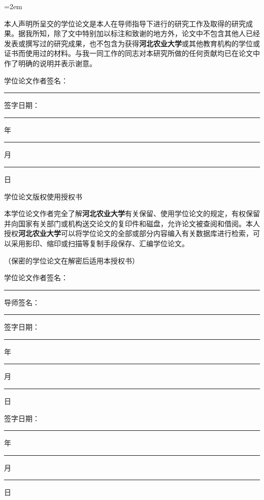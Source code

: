 {\songti\baselineskip=20pt
\parindent=2em%

本人声明所呈交的学位论文是本人在导师指导下进行的研究工作及取得的研究成果。据我所知，除了文中特别加以标注和致谢的地方外，论文中不包含其他人已经发表或撰写过的研究成果，也不包含为获得\textbf{河北农业大学}或其他教育机构的学位或证书而使用过的材料。与我一同工作的同志对本研究所做的任何贡献均已在论文中作了明确的说明并表示谢意。

\vspace{1.5cm}

\noindent
\begin{minipage}{0.48\textwidth}
  学位论文作者签名：\rule[-3pt]{3cm}{0.4pt}
\end{minipage}
\hfill
\begin{minipage}{0.48\textwidth}
  签字日期：\rule[-3pt]{1.2cm}{0.4pt}年\rule[-3pt]{1cm}{0.4pt}月\rule[-3pt]{1cm}{0.4pt}日
\end{minipage}

\vspace{2cm}

\begin{center}
  {\heiti\baselineskip=30pt 学位论文版权使用授权书}\\[12pt]
\end{center}

\vspace{0.3cm}

本学位论文作者完全了解\textbf{河北农业大学}有关保留、使用学位论文的规定，有权保留并向国家有关部门或机构送交论文的复印件和磁盘，允许论文被查阅和借阅。本人授权\textbf{河北农业大学}可以将学位论文的全部或部分内容编入有关数据库进行检索，可以采用影印、缩印或扫描等复制手段保存、汇编学位论文。

\vspace{0.5cm}

\noindent（保密的学位论文在解密后适用本授权书）

\vspace{1.5cm}

\noindent
\begin{minipage}{0.48\textwidth}
  学位论文作者签名：\rule[-3pt]{3cm}{0.4pt}
\end{minipage}
\hfill
\begin{minipage}{0.48\textwidth}
  导师签名：\rule[-3pt]{3cm}{0.4pt}
\end{minipage}

\vspace{1.2cm}

\noindent
\begin{minipage}{0.48\textwidth}
  签字日期：\rule[-3pt]{1.2cm}{0.4pt}年\rule[-3pt]{1cm}{0.4pt}月\rule[-3pt]{1cm}{0.4pt}日
\end{minipage}
\hfill
\begin{minipage}{0.48\textwidth}
  签字日期：\rule[-3pt]{1.2cm}{0.4pt}年\rule[-3pt]{1cm}{0.4pt}月\rule[-3pt]{1cm}{0.4pt}日
\end{minipage}

}
